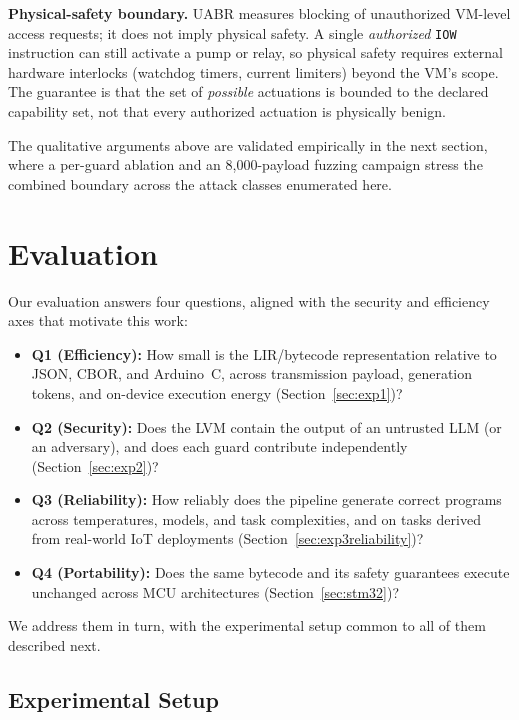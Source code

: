 \documentclass[a4paper,fleqn,longmktitle]{cas-dc}
\begin{document}
\noindent\textbf{Physical-safety boundary.} UABR measures blocking of unauthorized VM-level access requests; it does not imply physical safety. A single \emph{authorized} \texttt{IOW} instruction can still activate a pump or relay, so physical safety requires external hardware interlocks (watchdog timers, current limiters) beyond the VM's scope. The guarantee is that the set of \emph{possible} actuations is bounded to the declared capability set, not that every authorized actuation is physically benign.

The qualitative arguments above are validated empirically in the next section, where a per-guard ablation and an 8{,}000-payload fuzzing campaign stress the combined boundary across the attack classes enumerated here.

\section{Evaluation}
\label{sec:evaluation}

Our evaluation answers four questions, aligned with the security and efficiency axes that motivate this work:
\begin{itemize}[nosep]
  \item \textbf{Q1 (Efficiency):} How small is the LIR/bytecode representation relative to JSON, CBOR, and Arduino~C, across transmission payload, generation tokens, and on-device execution energy (Section~\ref{sec:exp1})?
  \item \textbf{Q2 (Security):} Does the LVM contain the output of an untrusted LLM (or an adversary), and does each guard contribute independently (Section~\ref{sec:exp2})?
  \item \textbf{Q3 (Reliability):} How reliably does the pipeline generate correct programs across temperatures, models, and task complexities, and on tasks derived from real-world IoT deployments (Section~\ref{sec:exp3reliability})?
  \item \textbf{Q4 (Portability):} Does the same bytecode and its safety guarantees execute unchanged across MCU architectures (Section~\ref{sec:stm32})?
\end{itemize}
We address them in turn, with the experimental setup common to all of them described next.

\subsection{Experimental Setup}
\label{sec:setup}
\end{document}
